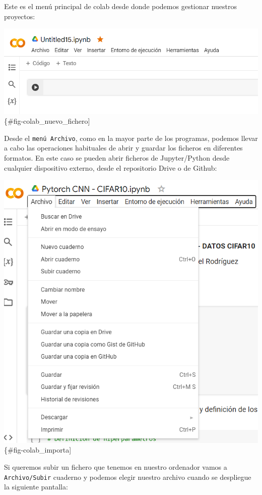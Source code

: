 \documentclass[
  a4paper,
  DIV=11,
  numbers=noendperiod]{scrreprt}
\begin{document}
Este es el menú principal de colab desde donde podemos gestionar
nuestros proyectos:

\includegraphics{imagenes/capitulo1/colab_nuevo_fichero.png}\{\#fig-colab\_nuevo\_fichero{]}

Desde el \texttt{menú\ Archivo}, como en la mayor parte de los
programas, podemos llevar a cabo las operaciones habituales de abrir y
guardar los ficheros en diferentes formatos. En este caso se pueden
abrir ficheros de Jupyter/Python desde cualquier dispositivo externo,
desde el repositorio Drive o de Github:

\includegraphics{imagenes/capitulo1/colab_importa.png}\{\#fig-colab\_importa{]}

Si queremos subir un fichero que tenemos en nuestro ordenador vamos a
\texttt{Archivo/Subir} cuaderno y podemos elegir nuestro archivo cuando
se despliegue la siguiente pantalla:
\end{document}
